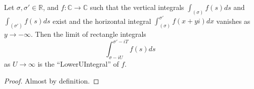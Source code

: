 \begin{lemma}
\label{RectangleIntegral_tendsTo_LowerU}
\leanok
Let $\sigma,\sigma' \in \mathbb{R}$, and $f : \mathbb{C} \to \mathbb{C}$ such that
  the vertical integrals $\int_{(\sigma)}f(s)ds$ and $\int_{(\sigma')}f(s)ds$ exist and
  the horizontal integral $\int_{(\sigma)}^{\sigma'}f(x + yi)dx$ vanishes as $y \to -\infty$.
  Then the limit of rectangle integrals
  $$\int_{\sigma-iU}^{\sigma'-iT}f(s)ds$$
  as $U\to\infty$ is the ``LowerUIntegral'' of $f$.
\end{lemma}
\begin{proof}
\leanok
Almost by definition.
\end{proof}
